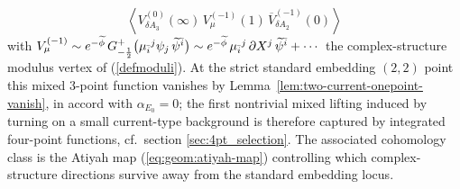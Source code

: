 \documentclass[12pt]{article}
\newcommand{\wt}[1]{\widetilde{#1}}
\begin{document}
\begin{enumerate}
			\[
			\left\langle V_{\delta A_3}^{(0)}(\infty)\,V_{\mu}^{(-1)}(1)\,\overline V_{\delta A_2}^{(-1)}(0)\right\rangle
			\]
			with $V_{\mu}^{(-1)}\sim e^{-{\wt\phi}}\,G^+_{-{1\over 2}}\big(\mu_{\bar i}{}^{j}\psi_{j}\,\wt\psi^{\bar i}\big)\sim e^{-{\wt\phi}}\,\mu_{\bar i}{}^{j}\,\partial X^{j}\,\wt\psi^{\bar i}+\cdots$ the complex-structure modulus vertex of (\ref{defmoduli}).
			At the strict standard embedding $(2,2)$ point this mixed 3-point function vanishes by Lemma~\ref{lem:two-current-onepoint-vanish}, in accord with $\alpha_{E_0}=0$; the first nontrivial mixed lifting induced by turning on a small current-type background is therefore captured by integrated four-point functions, cf.\ section \ref{sec:4pt_selection}. The associated cohomology class is the Atiyah map (\ref{eq:geom:atiyah-map}) controlling which complex-structure directions survive away from the standard embedding locus.
		

\end{enumerate}
\end{document}
